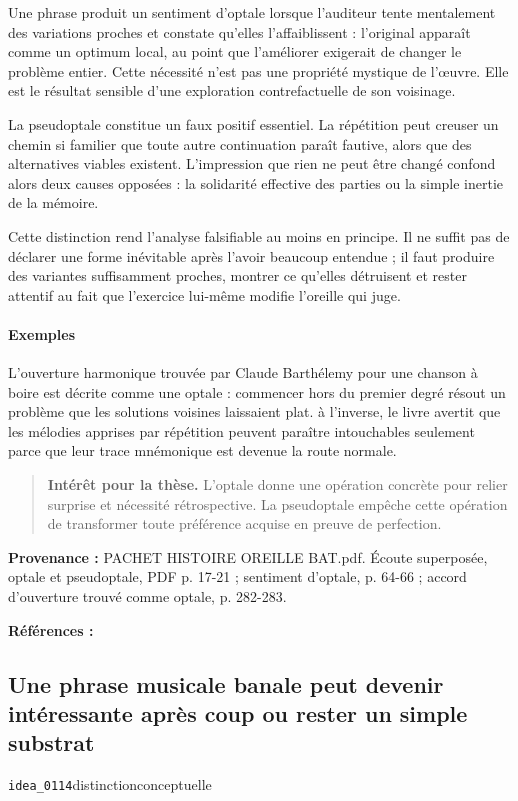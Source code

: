 \documentclass[10pt,a4paper]{article}
\begin{document}
Une phrase produit un sentiment d'optale lorsque l'auditeur tente mentalement des variations proches et constate qu'elles l'affaiblissent : l'original apparaît comme un optimum local, au point que l'améliorer exigerait de changer le problème entier. Cette nécessité n'est pas une propriété mystique de l'œuvre. Elle est le résultat sensible d'une exploration contrefactuelle de son voisinage.

La pseudoptale constitue un faux positif essentiel. La répétition peut creuser un chemin si familier que toute autre continuation paraît fautive, alors que des alternatives viables existent. L'impression que rien ne peut être changé confond alors deux causes opposées : la solidarité effective des parties ou la simple inertie de la mémoire.

Cette distinction rend l'analyse falsifiable au moins en principe. Il ne suffit pas de déclarer une forme inévitable après l'avoir beaucoup entendue ; il faut produire des variantes suffisamment proches, montrer ce qu'elles détruisent et rester attentif au fait que l'exercice lui-même modifie l'oreille qui juge.

\paragraph{Exemples}
L'ouverture harmonique trouvée par Claude Barthélemy pour une chanson à boire est décrite comme une optale : commencer hors du premier degré résout un problème que les solutions voisines laissaient plat. à l'inverse, le livre avertit que les mélodies apprises par répétition peuvent paraître intouchables seulement parce que leur trace mnémonique est devenue la route normale.

\begin{quote}
\textbf{Intérêt pour la thèse.} L'optale donne une opération concrète pour relier surprise et nécessité rétrospective. La pseudoptale empêche cette opération de transformer toute préférence acquise en preuve de perfection.
\end{quote}
{\footnotesize\color{metadata}\textbf{Provenance :} PACHET HISTOIRE OREILLE BAT.pdf. Écoute superposée, optale et pseudoptale, PDF p. 17-21 ; sentiment d'optale, p. 64-66 ; accord d'ouverture trouvé comme optale, p. 282-283.\par}
{\footnotesize\color{metadata}\textbf{Références :} \parencite{pachet2018oreille}\par}

\subsection{Une phrase musicale banale peut devenir intéressante après coup ou rester un simple substrat}
{\small\color{metadata} \texttt{idea\_0114}\quad\textbullet\quad distinction\quad\textbullet\quad conceptuelle\par}
\end{document}
